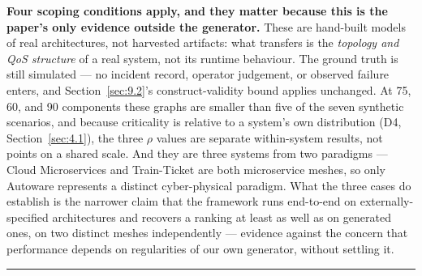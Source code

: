 \textbf{Four scoping conditions apply, and they matter because this is the paper's only evidence
outside the generator.} These are hand-built models of real architectures, not harvested artifacts:
what transfers is the \emph{topology and QoS structure} of a real system, not its runtime behaviour.
The ground truth is still simulated --- no incident record, operator judgement, or observed failure
enters, and Section~\ref{sec:9.2}'s construct-validity bound applies unchanged. At 75, 60, and 90
components these graphs are smaller than five of the seven synthetic scenarios, and because
criticality is relative to a system's own distribution (D4, Section~\ref{sec:4.1}), the three
\(\rho\) values are separate within-system results, not points on a shared scale. And they are three
systems from two paradigms --- Cloud Microservices and Train-Ticket are both microservice meshes, so
only Autoware represents a distinct cyber-physical paradigm. What the three cases do establish is the
narrower claim that the framework runs end-to-end on externally-specified architectures and recovers
a ranking at least as well as on generated ones, on two distinct meshes independently --- evidence
against the concern that performance depends on regularities of our own generator, without settling
it.

\begin{center}\rule{0.5\linewidth}{0.5pt}\end{center}
